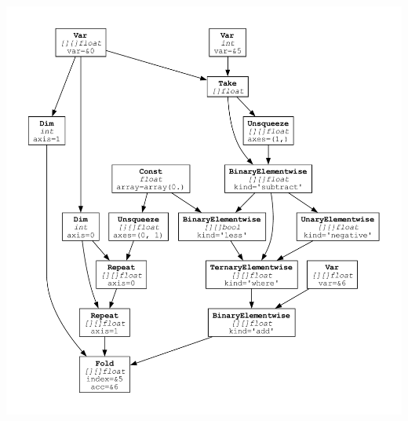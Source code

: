 \begin{center}
    \includegraphics[height=.42\textheight]{Sources/term-graphs/yarr.pdf}    
\end{center}

